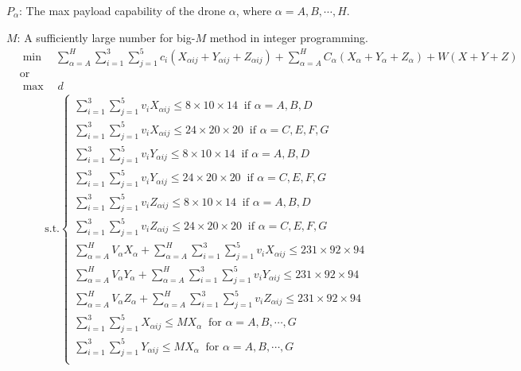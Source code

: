 \documentclass{mcmthesis}
\begin{document}
\noindent $P_\alpha$: The max payload capability of the drone $\alpha$, where $\alpha=A,B,\cdots,H$.

\noindent $M$: A sufficiently large number for big-$M$ method in integer programming. 
\[
\begin{aligned}
&\min\quad\sum_{\alpha=A}^{H}\sum_{i=1}^{3}\sum_{j=1}^{5}c_{i}\left(X_{\alpha ij}+Y_{\alpha ij}+Z_{\alpha ij}\right)
+\sum_{\alpha=A}^{H}C_{{\alpha}}\left(X_{\alpha}+Y_{\alpha }+Z_{\alpha }\right)+W(X+Y+Z)\\
&\text{or}\\
&\max\quad d
\end{aligned}
\]
\[
\begin{aligned}
\text{s.t.}
\left\{
\begin{array}{lr}
\sum\limits_{i=1}^{3}\sum\limits_{j=1}^{5}v_{i}X_{\alpha ij}\le 8\times 10\times 14\ \text{ if }\alpha=A,B,D \\
\sum\limits_{i=1}^{3}\sum\limits_{j=1}^{5}v_{i}X_{\alpha ij}\le 24\times 20\times 20\ \text{ if }\alpha=C,E,F,G \\
\sum\limits_{i=1}^{3}\sum\limits_{j=1}^{5}v_{i}Y_{\alpha ij}\le 8\times 10\times 14\ \text{ if }\alpha=A,B,D \\
\sum\limits_{i=1}^{3}\sum\limits_{j=1}^{5}v_{i}Y_{\alpha ij}\le 24\times 20\times 20\ \text{ if }\alpha=C,E,F,G \\
\sum\limits_{i=1}^{3}\sum\limits_{j=1}^{5}v_{i}Z_{\alpha ij}\le 8\times 10\times 14\ \text{ if }\alpha=A,B,D \\
\sum\limits_{i=1}^{3}\sum\limits_{j=1}^{5}v_{i}Z_{\alpha ij}\le 24\times 20\times 20\ \text{ if }\alpha=C,E,F,G \\
\sum\limits_{\alpha=A}^{H}V_{\alpha}X_{\alpha}+\sum\limits_{\alpha=A}^{H}\sum\limits_{i=1}^{3}\sum\limits_{j=1}^{5}v_{i}X_{\alpha ij}\le 231\times92\times 94\\
\sum\limits_{\alpha=A}^{H}V_{\alpha}Y_{\alpha}+\sum\limits_{\alpha=A}^{H}\sum\limits_{i=1}^{3}\sum\limits_{j=1}^{5}v_{i}Y_{\alpha ij}\le 231\times92\times 94\\
\sum\limits_{\alpha=A}^{H}V_{\alpha}Z_{\alpha}+\sum\limits_{\alpha=A}^{H}\sum\limits_{i=1}^{3}\sum\limits_{j=1}^{5}v_{i}Z_{\alpha ij}\le 231\times92\times 94\\
\sum\limits_{i=1}^{3}\sum\limits_{j=1}^{5}X_{\alpha ij}\le M X_{\alpha}\ \text{ for }\alpha=A,B,\cdots, G\\
\sum\limits_{i=1}^{3}\sum\limits_{j=1}^{5}Y_{\alpha ij}\le M X_{\alpha}\ \text{ for }\alpha=A,B,\cdots, G\\

\end{array}
\end{aligned}\]
\end{document}
